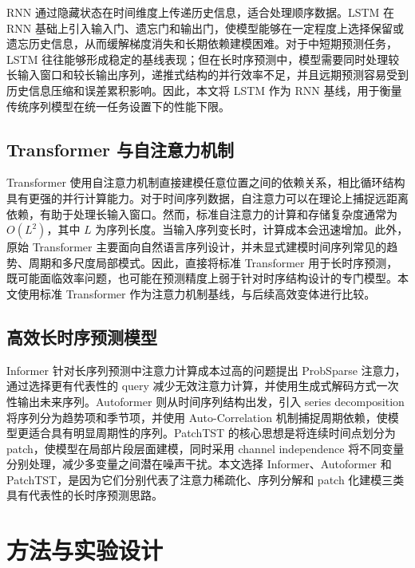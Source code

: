 RNN 通过隐藏状态在时间维度上传递历史信息，适合处理顺序数据。LSTM 在 RNN 基础上引入输入门、遗忘门和输出门，使模型能够在一定程度上选择保留或遗忘历史信息，从而缓解梯度消失和长期依赖建模困难。对于中短期预测任务，LSTM 往往能够形成稳定的基线表现；但在长时序预测中，模型需要同时处理较长输入窗口和较长输出序列，递推式结构的并行效率不足，并且远期预测容易受到历史信息压缩和误差累积影响。因此，本文将 LSTM 作为 RNN 基线，用于衡量传统序列模型在统一任务设置下的性能下限。

\subsection{Transformer 与自注意力机制}\label{transformer-ux4e0eux81eaux6ce8ux610fux529bux673aux5236}

Transformer 使用自注意力机制直接建模任意位置之间的依赖关系，相比循环结构具有更强的并行计算能力。对于时间序列数据，自注意力可以在理论上捕捉远距离依赖，有助于处理长输入窗口。然而，标准自注意力的计算和存储复杂度通常为 \(O(L^2)\)，其中 \(L\) 为序列长度。当输入序列变长时，计算成本会迅速增加。此外，原始 Transformer 主要面向自然语言序列设计，并未显式建模时间序列常见的趋势、周期和多尺度局部模式。因此，直接将标准 Transformer 用于长时序预测，既可能面临效率问题，也可能在预测精度上弱于针对时序结构设计的专门模型。本文使用标准 Transformer 作为注意力机制基线，与后续高效变体进行比较。

\subsection{高效长时序预测模型}\label{ux9ad8ux6548ux957fux65f6ux5e8fux9884ux6d4bux6a21ux578b}

Informer 针对长序列预测中注意力计算成本过高的问题提出 ProbSparse 注意力，通过选择更有代表性的 query 减少无效注意力计算，并使用生成式解码方式一次性输出未来序列。Autoformer 则从时间序列结构出发，引入 series decomposition 将序列分为趋势项和季节项，并使用 Auto-Correlation 机制捕捉周期依赖，使模型更适合具有明显周期性的序列。PatchTST 的核心思想是将连续时间点划分为 patch，使模型在局部片段层面建模，同时采用 channel independence 将不同变量分别处理，减少多变量之间潜在噪声干扰。本文选择 Informer、Autoformer 和 PatchTST，是因为它们分别代表了注意力稀疏化、序列分解和 patch 化建模三类具有代表性的长时序预测思路。

\section{方法与实验设计}\label{ux65b9ux6cd5ux4e0eux5b9eux9a8cux8bbeux8ba1}

